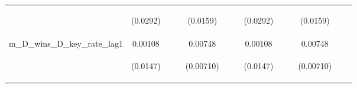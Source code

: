 \documentclass[]{article}
\begin{document}
\begin{center}
\begin{tabular}{lcccccccccccc}
\vspace{4pt} & \begin{footnotesize}(0.0292)\end{footnotesize} & \begin{footnotesize}\end{footnotesize} & \begin{footnotesize}\end{footnotesize} & \begin{footnotesize}(0.0159)\end{footnotesize} & \begin{footnotesize}\end{footnotesize} & \begin{footnotesize}\end{footnotesize} & \begin{footnotesize}(0.0292)\end{footnotesize} & \begin{footnotesize}\end{footnotesize} & \begin{footnotesize}\end{footnotesize} & \begin{footnotesize}(0.0159)\end{footnotesize} & \begin{footnotesize}\end{footnotesize} & \begin{footnotesize}\end{footnotesize} \\
m\_D\_wins\_D\_key\_rate\_lag1 & 0.00108 &  &  & 0.00748 &  &  & 0.00108 &  &  & 0.00748 &  &  \\
\vspace{4pt} & \begin{footnotesize}(0.0147)\end{footnotesize} & \begin{footnotesize}\end{footnotesize} & \begin{footnotesize}\end{footnotesize} & \begin{footnotesize}(0.00710)\end{footnotesize} & \begin{footnotesize}\end{footnotesize} & \begin{footnotesize}\end{footnotesize} & \begin{footnotesize}(0.0147)\end{footnotesize} & \begin{footnotesize}\end{footnotesize} & \begin{footnotesize}\end{footnotesize} & \begin{footnotesize}(0.00710)\end{footnotesize} & \begin{footnotesize}\end{footnotesize} & \begin{footnotesize}\end{footnotesize} \\

\end{tabular}
\end{center}
\end{document}
